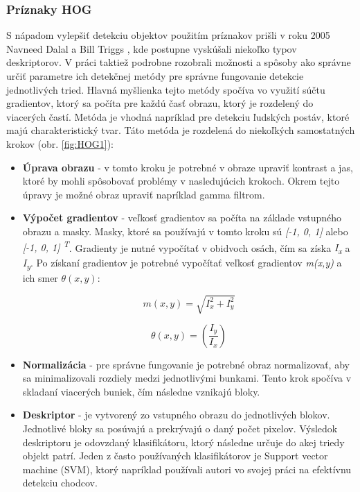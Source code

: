 \documentclass[slovak,master,dept460,male,cpp,cpdeclaration]{diploma}
\begin{document}
\subsubsection*{Príznaky HOG}
\label{HOG}
S nápadom  vylepšiť detekciu objektov použitím príznakov prišli v roku 2005 Navneed Dalal a Bill Triggs \cite{dalal2005}, kde postupne vyskúšali niekoľko typov deskriptorov.  V práci taktiež podrobne rozobrali  možnosti a spôsoby ako správne určiť parametre ich detekčnej metódy pre správne fungovanie detekcie jednotlivých tried. Hlavná myšlienka tejto metódy spočíva vo využití súčtu gradientov, ktorý sa počíta pre  každú časť obrazu, ktorý je rozdelený do viacerých častí. Metóda je vhodná napríklad pre detekciu ľudských postáv, ktoré majú charakteristický tvar. Táto metóda je rozdelená do niekoľkých samostatných krokov (obr. \ref{fig:HOG1}):
\begin{itemize}
  \item \textbf{Úprava obrazu} - v tomto kroku je potrebné  v obraze upraviť kontrast a jas, ktoré by mohli spôsobovať  problémy v nasledujúcich krokoch. Okrem tejto úpravy  je možné obraz upraviť napríklad gamma filtrom.
  \item \textbf{Výpočet gradientov} - veľkosť gradientov sa počíta na základe vstupného obrazu a masky. Masky, ktoré sa používajú v tomto kroku sú \textit{[-1, 0, 1]} alebo \textit{[-1, 0, 1] \textsuperscript{T}}. Gradienty je nutné vypočítať v obidvoch osách, čím sa získa \textit{I\textsubscript{x}} a \textit{I\textsubscript{y}}. Po získaní gradientov je potrebné vypočítať veľkosť gradientov \textit{m(x,y)} a ich smer \textit{$\theta(x, y)$}:
  
\begin{equation}
m(x,y)= \sqrt{I_{x}^{2} + I_{y}^{2}}
\label{eq:Výpočet veľkosti gradientu}
\end{equation}

  \begin{equation}
\theta(x, y) = \left(\frac{I_{y}}{I_{x}}\right)
\label{eq:Výpočet smeru gradientu}
\end{equation}
  \item \textbf{Normalizácia} -  pre správne fungovanie je potrebné obraz normalizovať, aby sa minimalizovali rozdiely medzi jednotlivými bunkami. Tento krok spočíva v skladaní viacerých buniek, čím následne vznikajú bloky. 
   \item \textbf{Deskriptor} -  je vytvorený zo vstupného obrazu do jednotlivých blokov. Jednotlivé bloky sa posúvajú a prekrývajú o daný počet pixelov. Výsledok deskriptoru je odovzdaný  klasifikátoru, ktorý následne určuje do akej triedy objekt patrí. Jeden z často používaných klasifikátorov je Support vector machine (SVM), ktorý napríklad používali autori vo svojej práci na efektívnu detekciu chodcov\cite{pang2011efficient}.
 \end{itemize}
\end{document}
